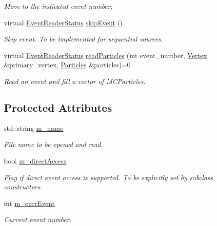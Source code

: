 \begin{DoxyCompactItemize}
\begin{DoxyCompactList}\small\item\em Move to the indicated event number. \item\end{DoxyCompactList}\item 
virtual \hyperlink{class_d_d4hep_1_1_simulation_1_1_geant4_event_reader_ae4f4bc83ffcf5b0c1868ad78859851e7}{EventReaderStatus} \hyperlink{class_d_d4hep_1_1_simulation_1_1_geant4_event_reader_a9381626ad4f4fa20e304414f6654ee03}{skipEvent} ()
\begin{DoxyCompactList}\small\item\em Skip event. To be implemented for sequential sources. \item\end{DoxyCompactList}\item 
virtual \hyperlink{class_d_d4hep_1_1_simulation_1_1_geant4_event_reader_ae4f4bc83ffcf5b0c1868ad78859851e7}{EventReaderStatus} \hyperlink{class_d_d4hep_1_1_simulation_1_1_geant4_event_reader_ac72f293d08b3a2cd9228f56638656613}{readParticles} (int event\_\-number, \hyperlink{class_d_d4hep_1_1_simulation_1_1_geant4_vertex}{Vertex} \&primary\_\-vertex, \hyperlink{class_d_d4hep_1_1_simulation_1_1_geant4_event_reader_afa252e93d319aef2810a17aa78bb4603}{Particles} \&particles)=0
\begin{DoxyCompactList}\small\item\em Read an event and fill a vector of MCParticles. \item\end{DoxyCompactList}\end{DoxyCompactItemize}
\subsection*{Protected Attributes}
\begin{DoxyCompactItemize}
\item 
std::string \hyperlink{class_d_d4hep_1_1_simulation_1_1_geant4_event_reader_a0a6ea787174ce598d22ce1616c1f25af}{m\_\-name}
\begin{DoxyCompactList}\small\item\em File name to be opened and read. \item\end{DoxyCompactList}\item 
bool \hyperlink{class_d_d4hep_1_1_simulation_1_1_geant4_event_reader_a1902827774d01fd87f38cbee29696fe0}{m\_\-directAccess}
\begin{DoxyCompactList}\small\item\em Flag if direct event access is supported. To be explicitly set by subclass constructors. \item\end{DoxyCompactList}\item 
int \hyperlink{class_d_d4hep_1_1_simulation_1_1_geant4_event_reader_a3f1446121fae285cd2772ca9bd1d8af3}{m\_\-currEvent}
\begin{DoxyCompactList}\small\item\em Current event number. \item\end{DoxyCompactList}\end{DoxyCompactItemize}


